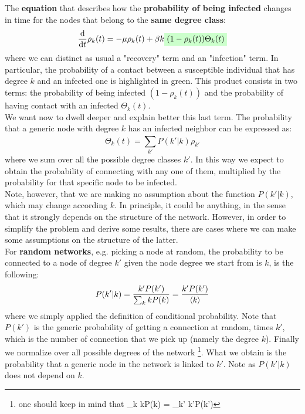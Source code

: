\documentclass[../main/main.tex]{subfiles}
\begin{document}
The \textbf{equation} that describes how the \textbf{probability of being infected} changes in time for the nodes that belong to the \textbf{same degree class}:
\begin{equation}
  \dv{}{t}  \rho _k (t) = - \mu \rho _k (t) + \beta k \mathcolorbox{green!20}{(1- \rho _k (t)) \Theta _k (t)}
\end{equation}
where we can distinct as usual a "recovery" term and an "infection" term. In particular, the probability of a contact between a susceptible individual that has degree \( k \) and an infected one is highlighted in green.
This product consists in two terms: the probability of being infected \( (1- \rho _k (t)) \) and the probability of having contact with an infected \( \Theta _k (t) \).\\
We want now to dwell deeper and explain better this last term. The probability that a generic node with degree \( k \) has an infected neighbor can be expressed as:
\begin{equation}
\label{eqn:theta_k(t)}
  \Theta _k(t) = \sum_{k'}^{} P(k'|k)\rho _{k'}
\end{equation}
where we sum over all the possible degree classes $k'$. In this way we expect to obtain the probability of connecting with any one of them, multiplied by the probability for that specific node to be infected.\\
Note, however, that we are making no assumption about the function \(  P(k'|k) \), which may change according \( k \). In principle, it could be anything, in the sense that it strongly depends on the structure of the network. However, in order to simplify the problem and derive some results, there are cases where we can make some assumptions on the structure of the latter.\\

For \textbf{random networks}, e.g. picking a node at random, the probability to be connected to a node of degree $k'$ given the node degree we start from is $k$, is the following:
\begin{equation}
  P(k'|k) = \frac{k'P(k')}{\sum_{k} k P(k)  } = \frac{k'P(k')}{\expval{k}  }
\end{equation}
where we simply applied the definition of conditional probability. Note that \( P(k') \) is the generic probability of getting a connection at random, times \( k' \), which is the number of connection that we pick up (namely the degree $k$). Finally we normalize over all possible degrees of the network \footnote{one should keep in mind that \sum_{k} kP(k) = \sum_{k'} k'P(k') }. What we obtain is the probability that a generic node in the network is linked to \( k' \).  Note as \( P(k'|k) \) does not depend on \( k \).\\
\end{document}
